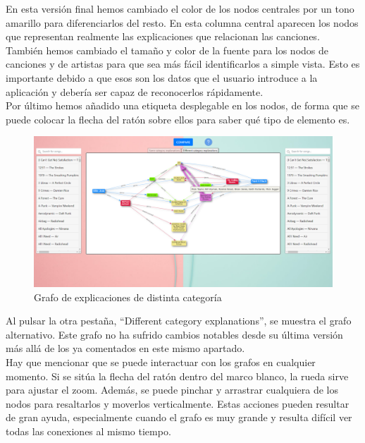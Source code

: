 En esta versión final hemos cambiado el color de los nodos centrales por un tono amarillo para diferenciarlos del resto. En esta columna central aparecen los nodos que representan realmente las explicaciones que relacionan las canciones.\\

También hemos cambiado el tamaño y color de la fuente para los nodos de canciones y de artistas para que sea más fácil identificarlos a simple vista. Esto es importante debido a que esos son los datos que el usuario introduce a la aplicación y debería ser capaz de reconocerlos rápidamente.\\

Por último hemos añadido una etiqueta desplegable en los nodos, de forma que se puede colocar la flecha del ratón sobre ellos para saber qué tipo de elemento es.\\

\begin{figure}[h!]
	\centering
	\includegraphics[width = 1\textwidth]{Imagenes/Bitmap/Pantalla different graph.png}
	\caption{Grafo de explicaciones de distinta categoría}
	\label{fig:sampleImage}
\end{figure}

Al pulsar la otra pestaña, ``Different category explanations'', se muestra el grafo alternativo. Este grafo no ha sufrido cambios notables desde su última versión más allá de los ya comentados en este mismo apartado.\\

Hay que mencionar que se puede interactuar con los grafos en cualquier momento. Si se sitúa la flecha del ratón dentro del marco blanco, la rueda sirve para ajustar el zoom. Además, se puede pinchar y arrastrar cualquiera de los nodos para resaltarlos y moverlos verticalmente. Estas acciones pueden resultar de gran ayuda, especialmente cuando el grafo es muy grande y resulta difícil ver todas las conexiones al mismo tiempo.\\

